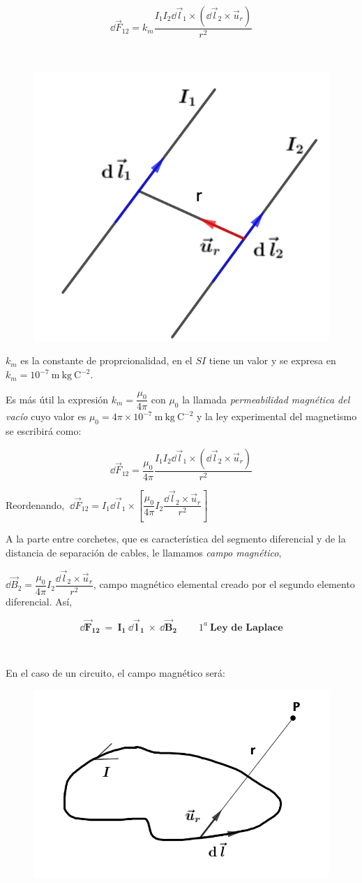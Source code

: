 \begin{multicols}{2}
$$\dd \vec F_{12}=k_m\dfrac{I_1I_2\dd \vec l_1 \times (\dd \vec l_2 \times \vec u_r)}{r^2}$$

$\quad$
\begin{figure}[H]
	\centering
	\includegraphics[width=.35\textwidth]{imagenes/imagenes26/T26IM02.png}
\end{figure}	
\end{multicols}

$k_m$ es la constante de proprcionalidad, en el $SI$ tiene un valor y se expresa en $k_m=10^{-7}\ \mathrm{m\ kg\ C}^{-2}$. 

Es más útil la expresión $k_m=\dfrac{\mu_0}{4\pi}$ con $\mu_0$ la llamada \emph{permeabilidad magnética del vacío} cuyo valor es 
$\mu_0 = 4 \pi \times 10^{-7} \ \mathrm{m\ kg\ C}^{-2}$ y la ley experimental del magnetismo se escribirá como:

\begin{equation}
\dd \vec F_{12}=\dfrac{\mu_0}{4\pi} \dfrac{I_1I_2\dd \vec l_1 \times (\dd \vec l_2 \times \vec u_r)}{r^2}	
\end{equation}

Reordenando, $\ \dd \vec F_{12}=
I_1 \dd \vec l_1 \times \left[ 
\dfrac{\mu_0}{4\pi} I_2 \dfrac{\dd \vec l_2 \times \vec u_r}{r^2}
\right]$	

A la parte entre corchetes, que es característica del segmento diferencial y de la distancia de separación de cables, le llamamos \emph{campo magnético},

$\dd \vec B_2=\dfrac{\mu_0}{4\pi} I_2 \dfrac{\dd \vec l_2 \times \vec u_r}{r^2}$, campo magnético elemental creado por el segundo elemento diferencial. Así,

\begin{equation}
\boldsymbol{ \dd \vec F_{12} \ = \ I_1 \ \dd \vec l_1 \ \times \ \dd \vec B_2 } \qquad \ 1^a \ \textbf{Ley de Laplace}	
\end{equation}
\vspace{35mm}%
\begin{multicols}{2}
$\quad$

En el caso de un circuito, el campo magnético será:

\begin{figure}[H]
	\centering
	\includegraphics[width=.3\textwidth]{imagenes/imagenes26/T26IM03.png}
\end{figure}	
\end{multicols}

